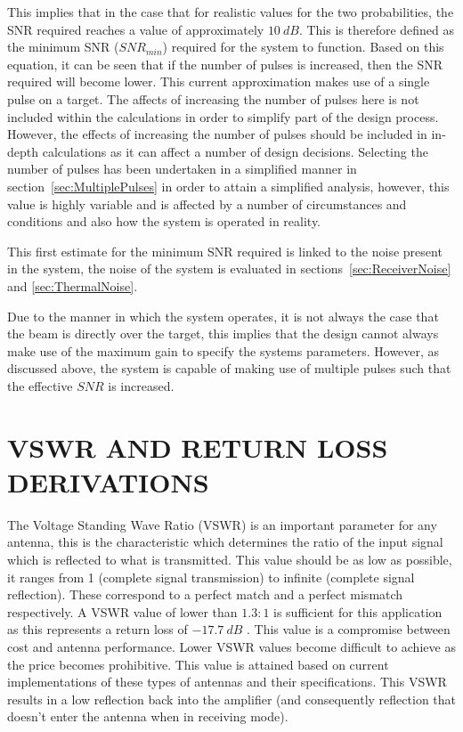 \documentclass[11pt]{witseiepaper}
\begin{document}
\begin{bibunit}[witseie]
This implies that in the case that for realistic values for the two probabilities, the SNR required reaches a value of approximately $10~dB$.
This is therefore defined as the minimum SNR ($SNR_{min}$) required for the system to function.
Based on this equation, it can be seen that if the number of pulses is increased, then the SNR required will become lower. This current approximation makes use of a single pulse on a target. The affects of increasing the number of pulses here is not included within the calculations in order to simplify part of the design process. However, the effects of increasing the number of pulses should be included in in-depth calculations as it can affect a number of design decisions. Selecting the number of pulses has been undertaken in a simplified manner in section~\ref{sec:MultiplePulses} in order to attain a simplified analysis, however, this value is highly variable and is affected by a number of circumstances and conditions and also how the system is operated in reality.


This first estimate for the minimum SNR required is linked to the noise present in the system, the noise of the system is evaluated in sections~\ref{sec:ReceiverNoise} and \ref{sec:ThermalNoise}.

Due to the manner in which the system operates, it is not always the case that the beam is directly over the target, this implies that the design cannot always make use of the maximum gain to specify the systems parameters. However, as discussed above, the system is capable of making use of multiple pulses such that the effective $SNR$ is increased. 

\section{VSWR AND RETURN LOSS DERIVATIONS} \label{sec:VSWRandReturnLossDerivations}
The Voltage Standing Wave Ratio (VSWR) is an important parameter for any antenna, this is the characteristic which determines the ratio of the input signal which is reflected to what is transmitted. This value should be as low as possible, it ranges from 1 (complete signal transmission) to infinite (complete signal reflection). These correspond to a perfect match and a perfect mismatch respectively.
A VSWR value of lower than $1.3:1$ is sufficient for this application as this represents a return loss of $-17.7~dB$ \cite{AntennaPrice1,AntennaPrice2,AntennaPrice3,AntennaPrice4}. This value is a compromise between cost and antenna performance. Lower VSWR values become difficult to achieve as the price becomes prohibitive. This value is attained based on current implementations of these types of antennas and their specifications.
This VSWR results in a low reflection back into the amplifier (and consequently reflection that doesn't enter the antenna when in receiving mode).


\end{bibunit}
\end{document}
